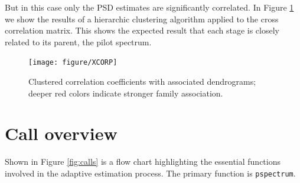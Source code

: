 \documentclass{article}\usepackage{graphicx, color}
\newenvironment{knitrout}{}{} %
\newcommand{\Rcmd}[1]{\texttt{#1}}
\begin{document}
But in this case only the PSD estimates are significantly correlated.
In Figure \ref{fig:histcorrel} we show the results of a hierarchic
clustering
algorithm applied to the cross correlation matrix.  This shows
the expected result that
each stage is closely related to its parent, the pilot spectrum.

\begin{figure}[htb!]
\begin{center}
\begin{knitrout}
\color{fgcolor}
\texttt{[image: figure/XCORP]} 

\end{knitrout}

\caption{Clustered correlation coefficients with associated dendrograms;
deeper red colors indicate stronger family association.}
\label{fig:histcorrel}
\end{center}
\end{figure}

\section{Call overview}

Shown
in Figure \ref{fig:calls}
is a flow chart 
highlighting the essential
functions involved in the adaptive estimation
process. The primary function is \Rcmd{pspectrum}.
\end{document}
